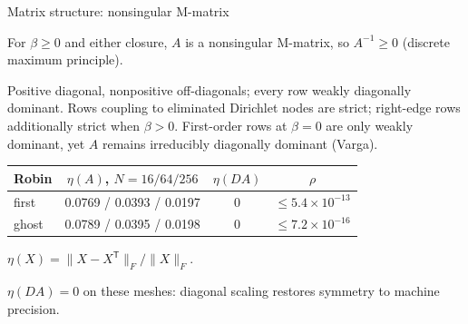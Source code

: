 \documentclass[aspectratio=169,8pt,t]{beamer}
\begin{document}
\begin{frame}{Matrix structure: nonsingular M-matrix}
\bodytop\vspace{-\blockskip}
\begin{theorem}[M-matrix]
For $\beta\ge0$ and either closure, $A$ is a nonsingular M-matrix, so $A^{-1}\ge0$ (discrete maximum principle).
\end{theorem}
Positive diagonal, nonpositive off-diagonals; every row weakly diagonally dominant. Rows coupling to eliminated Dirichlet nodes are strict; right-edge rows additionally strict when $\beta>0$. First-order rows at $\beta=0$ are only weakly dominant, yet $A$ remains irreducibly diagonally dominant (Varga).
\blockgap
{\tabfont\begin{tabular}{@{}lccc@{}}\toprule
Robin & $\eta(A)$, $N=16/64/256$ & $\eta(DA)$ & $\rho$\\\midrule
first & 0.0769 / 0.0393 / 0.0197 & 0 & $\le5.4\times10^{-13}$\\
ghost & 0.0789 / 0.0395 / 0.0198 & 0 & $\le7.2\times10^{-16}$\\\bottomrule
\end{tabular}}\blockgap
{\color{note}\notesize $\eta(X)=\|X-X^{\mathsf T}\|_F/\|X\|_F$.\par}
\closing{$\eta(DA)=0$ on these meshes: diagonal scaling restores symmetry to machine precision.}
\end{frame}
\end{document}

